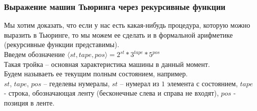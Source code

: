 \subsubsection{Выражение машин Тьюринга через рекурсивные функции}
\label{sec-12-5-1}
Мы хотим доказать, что если у нас есть какая-нибудь процедура, которую можно выразить в Тьюринге, то мы можем ее сделать и в формальной арифметике (рекурсивные функции представимы).\\
Введем обозначение $\langle st,tape,pos \rangle = 2^{st}*3^{tape}*5^{pos}$\\
Такая тройка -- основная характеристика машины в данный момент.\\
Будем называеть ее текущим полным состоянием, например.\\
$st$, $tape$, $pos$ -- геделевы нумералы, $st$ -- нумерал из $1$ элемента с состоянием, $tape$ - строка, обозначающая ленту (бесконечные слева и справа не входят), $pos$ - позиция в ленте.

